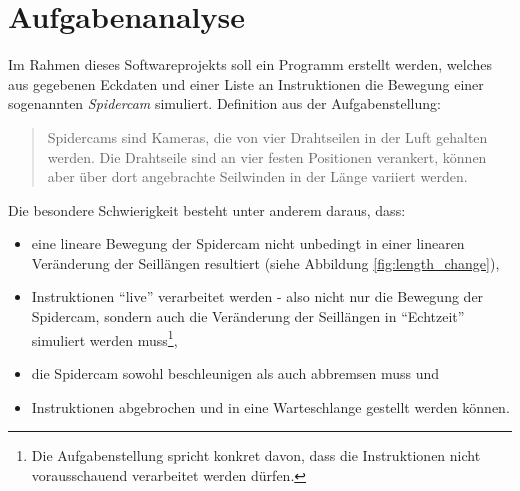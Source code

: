 \section{Aufgabenanalyse}
\label{sec:aufgabenanalyse}

Im Rahmen dieses Softwareprojekts soll ein Programm erstellt werden, welches aus gegebenen Eckdaten und einer Liste an Instruktionen die Bewegung einer sogenannten \emph{Spidercam} simuliert.
Definition aus der Aufgabenstellung:
\begin{quote}
    Spidercams sind Kameras, die von vier Drahtseilen in der Luft gehalten werden.
    Die Drahtseile sind an vier festen Positionen verankert, können aber über dort angebrachte Seilwinden in der Länge variiert werden.
\end{quote}

Die besondere Schwierigkeit besteht unter anderem daraus, dass:
\begin{itemize}
    \item eine lineare Bewegung der Spidercam nicht unbedingt in einer linearen Veränderung der Seillängen resultiert (siehe Abbildung \ref{fig:length_change}),
    \item Instruktionen \enquote{live} verarbeitet werden - also nicht nur die Bewegung der Spidercam, sondern auch die Veränderung der Seillängen in \enquote{Echtzeit} simuliert werden muss\footnote{Die Aufgabenstellung spricht konkret davon, dass die Instruktionen nicht vorausschauend verarbeitet werden dürfen.},
    \item die Spidercam sowohl beschleunigen als auch abbremsen muss und
    \item Instruktionen abgebrochen und in eine Warteschlange gestellt werden können.
\end{itemize}

